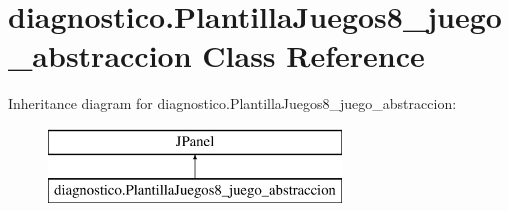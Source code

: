 \hypertarget{classdiagnostico_1_1_plantilla_juegos8__juego__abstraccion}{}\section{diagnostico.\+Plantilla\+Juegos8\+\_\+juego\+\_\+abstraccion Class Reference}
\label{classdiagnostico_1_1_plantilla_juegos8__juego__abstraccion}
Inheritance diagram for diagnostico.\+Plantilla\+Juegos8\+\_\+juego\+\_\+abstraccion\+:\begin{figure}[H]
\begin{center}
\leavevmode
\includegraphics[height=2.000000cm]{classdiagnostico_1_1_plantilla_juegos8__juego__abstraccion}
\end{center}
\end{figure}
